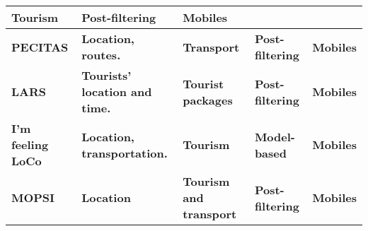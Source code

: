 \begin{sidewaystable}[]
\begin{tabular}{p{3.5cm} p{6cm} p{4cm} p{3cm} p{3cm} }
            \textbf{Tourism} & \textbf{Post-filtering} & \textbf{Mobiles} \\ \hline
            \textbf{PECITAS} & \textbf{Location, routes.} & \textbf{Transport} & 
            \textbf{Post-filtering} & \textbf{Mobiles} \\ \hline
            \textbf{LARS} & \textbf{Tourists’ location and time.} & 
            \textbf{Tourist packages} & \textbf{Post-filtering} & \textbf{Mobiles} \\ 
            \hline
            \textbf{I'm feeling LoCo} & \textbf{Location, transportation.} & 
            \textbf{Tourism} & \textbf{Model-based} & \textbf{Mobiles} \\ \hline
            \textbf{MOPSI} & \textbf{Location} & \textbf{Tourism and transport} & 
            \textbf{Post-filtering} & \textbf{Mobiles} \\ \hline
           \bottomrule
        \end{tabular}\hspace*{-1cm}
\end{sidewaystable}








